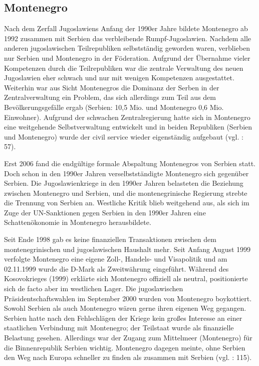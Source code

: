 \subsection{Montenegro}
Nach dem Zerfall Jugoslawiens Anfang der 1990er Jahre bildete Montenegro ab 1992 zusammen mit Serbien das verbleibende Rumpf-Jugoslawien. Nachdem alle anderen jugoslawischen Teilrepubliken selbstständig geworden waren, verblieben nur Serbien und Montenegro in der Föderation. Aufgrund der Übernahme vieler Kompetenzen durch die Teilrepubliken war die zentrale Verwaltung des neuen Jugoslawien eher schwach und nur mit wenigen Kompetenzen ausgestattet. Weiterhin war aus Sicht Montenegros die Dominanz der Serben in der Zentralverwaltung ein Problem, das sich allerdings zum Teil aus dem Bevölkerungsgefälle ergab (Serbien: 10,5 Mio. und Montenegro 0,6 Mio. Einwohner). Aufgrund der schwachen Zentralregierung hatte sich in Montenegro eine weitgehende Selbstverwaltung entwickelt und in beiden Republiken (Serbien und Montenegro) wurde der civil service wieder eigenständig aufgebaut (vgl. \cite{sevic} : 57).\par
Erst 2006 fand die endgültige formale Abspaltung Montenegros von Serbien statt. Doch schon in den 1990er Jahren verselbstständigte Montenegro sich gegenüber Serbien. Die Jugoslawienkriege in den 1990er Jahren belasteten die Beziehung zwischen Montenegro und Serbien, und die montenegrinische Regierung strebte die Trennung von Serbien an. Westliche Kritik blieb weitgehend aus, als sich im Zuge der UN-Sanktionen gegen Serbien in den 1990er Jahren eine Schattenökonomie in Montenegro herausbildete.\par
Seit Ende 1998 gab es keine finanziellen Transaktionen zwischen dem montenegrinischen und jugoslawischen Haushalt mehr. Seit Anfang August 1999 verfolgte Montenegro eine eigene Zoll-, Handels- und Visapolitik und am 02.11.1999 wurde die D-Mark als Zweitwährung eingeführt. Während des Kosovokrieges (1999) erklärte sich Montenegro offiziell als neutral, positionierte sich de facto aber im westlichen Lager. Die jugoslawischen Präsidentschaftswahlen im September 2000 wurden von Montenegro boykottiert. Sowohl Serbien als auch Montenegro wären gerne ihren eigenen Weg gegangen. Serbien hatte nach den Fehlschlägen der Kriege kein großes Interesse an einer staatlichen Verbindung mit Montenegro; der Teilstaat wurde als finanzielle Belastung gesehen. Allerdings war der Zugang zum Mittelmeer (Montenegro) für die Binnenrepublik Serbien wichtig. Montenegro dagegen meinte, ohne Serbien den Weg nach Europa schneller zu finden als zusammen mit Serbien (vgl. \cite{schmitz04} : 115).\par
